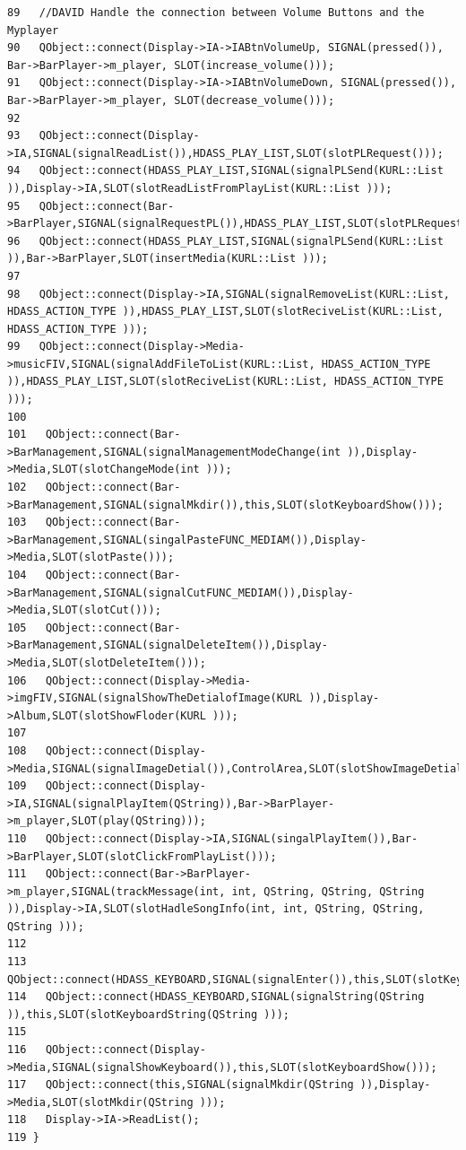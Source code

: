 \begin{verbatim}
89   //DAVID Handle the connection between Volume Buttons and the Myplayer
90   QObject::connect(Display->IA->IABtnVolumeUp, SIGNAL(pressed()), Bar->BarPlayer->m_player, SLOT(increase_volume()));
91   QObject::connect(Display->IA->IABtnVolumeDown, SIGNAL(pressed()), Bar->BarPlayer->m_player, SLOT(decrease_volume()));
92   
93   QObject::connect(Display->IA,SIGNAL(signalReadList()),HDASS_PLAY_LIST,SLOT(slotPLRequest()));
94   QObject::connect(HDASS_PLAY_LIST,SIGNAL(signalPLSend(KURL::List )),Display->IA,SLOT(slotReadListFromPlayList(KURL::List )));
95   QObject::connect(Bar->BarPlayer,SIGNAL(signalRequestPL()),HDASS_PLAY_LIST,SLOT(slotPLRequest()));
96   QObject::connect(HDASS_PLAY_LIST,SIGNAL(signalPLSend(KURL::List )),Bar->BarPlayer,SLOT(insertMedia(KURL::List )));
97   
98   QObject::connect(Display->IA,SIGNAL(signalRemoveList(KURL::List, HDASS_ACTION_TYPE )),HDASS_PLAY_LIST,SLOT(slotReciveList(KURL::List, HDASS_ACTION_TYPE )));
99   QObject::connect(Display->Media->musicFIV,SIGNAL(signalAddFileToList(KURL::List, HDASS_ACTION_TYPE )),HDASS_PLAY_LIST,SLOT(slotReciveList(KURL::List, HDASS_ACTION_TYPE )));
100   
101   QObject::connect(Bar->BarManagement,SIGNAL(signalManagementModeChange(int )),Display->Media,SLOT(slotChangeMode(int )));
102   QObject::connect(Bar->BarManagement,SIGNAL(signalMkdir()),this,SLOT(slotKeyboardShow()));
103   QObject::connect(Bar->BarManagement,SIGNAL(singalPasteFUNC_MEDIAM()),Display->Media,SLOT(slotPaste()));
104   QObject::connect(Bar->BarManagement,SIGNAL(signalCutFUNC_MEDIAM()),Display->Media,SLOT(slotCut()));
105   QObject::connect(Bar->BarManagement,SIGNAL(signalDeleteItem()),Display->Media,SLOT(slotDeleteItem()));
106   QObject::connect(Display->Media->imgFIV,SIGNAL(signalShowTheDetialofImage(KURL )),Display->Album,SLOT(slotShowFloder(KURL )));
107   
108   QObject::connect(Display->Media,SIGNAL(signalImageDetial()),ControlArea,SLOT(slotShowImageDetial()));
109   QObject::connect(Display->IA,SIGNAL(signalPlayItem(QString)),Bar->BarPlayer->m_player,SLOT(play(QString)));
110   QObject::connect(Display->IA,SIGNAL(singalPlayItem()),Bar->BarPlayer,SLOT(slotClickFromPlayList()));
111   QObject::connect(Bar->BarPlayer->m_player,SIGNAL(trackMessage(int, int, QString, QString, QString )),Display->IA,SLOT(slotHadleSongInfo(int, int, QString, QString, QString )));
112   
113   QObject::connect(HDASS_KEYBOARD,SIGNAL(signalEnter()),this,SLOT(slotKeyboardHide()));
114   QObject::connect(HDASS_KEYBOARD,SIGNAL(signalString(QString )),this,SLOT(slotKeyboardString(QString )));
115   
116   QObject::connect(Display->Media,SIGNAL(signalShowKeyboard()),this,SLOT(slotKeyboardShow()));
117   QObject::connect(this,SIGNAL(signalMkdir(QString )),Display->Media,SLOT(slotMkdir(QString )));
118   Display->IA->ReadList();
119 }
\end{verbatim}\normalsize 


